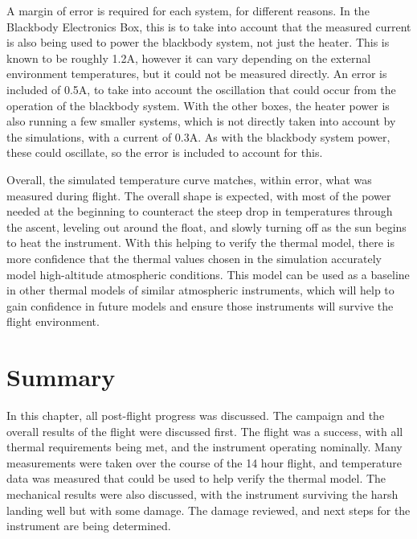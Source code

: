 A margin of error is required for each system, for different reasons. In the Blackbody Electronics Box, this is to take into account that the measured current is also being used to power the blackbody system, not just the heater. This is known to be roughly 1.2A, however it can vary depending on the external environment temperatures, but it could not be measured directly. An error is included of 0.5A, to take into account the oscillation that could occur from the operation of the blackbody system. With the other boxes, the heater power is also running a few smaller systems, which is not directly taken into account by the simulations, with a current of 0.3A. As with the blackbody system power, these could oscillate, so the error is included to account for this.

Overall, the simulated temperature curve matches, within error, what was measured during flight. The overall shape is expected, with most of the power needed at the beginning to counteract the steep drop in temperatures through the ascent, leveling out around the float, and slowly turning off as the sun begins to heat the instrument. With this helping to verify the thermal model, there is more confidence that the thermal values chosen in the simulation accurately model high-altitude atmospheric conditions. This model can be used as a baseline in other thermal models of similar atmospheric instruments, which will help to gain confidence in future models and ensure those instruments will survive the flight environment.

\section{Summary}
In this chapter, all post-flight progress was discussed. The campaign and the overall results of the flight were discussed first. The flight was a success, with all thermal requirements being met, and the instrument operating nominally. Many measurements were taken over the course of the 14 hour flight, and temperature data was measured that could be used to help verify the thermal model. The mechanical results were also discussed, with the instrument surviving the harsh landing well but with some damage. The damage reviewed, and next steps for the instrument are being determined.


